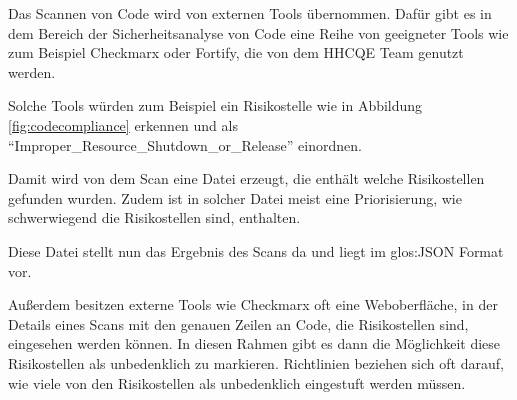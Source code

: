 \documentclass[../main.tex]{subfiles}
\begin{document}
Das Scannen von Code wird von externen Tools übernommen.
Dafür gibt es in dem Bereich der Sicherheitsanalyse von Code eine Reihe von geeigneter Tools wie zum Beispiel Checkmarx oder Fortify, die von dem \gls{HHCQE} Team genutzt werden.

Solche Tools würden zum Beispiel ein Risikostelle wie in Abbildung \ref{fig:codecompliance} erkennen und als \enquote{Improper\_Resource\_Shutdown\_or\_Release} einordnen.
\cite{SASTTools}

Damit wird von dem Scan eine Datei erzeugt, die enthält welche Risikostellen gefunden wurden.
Zudem ist in solcher Datei meist eine Priorisierung, wie schwerwiegend die Risikostellen sind, enthalten.

Diese Datei stellt nun das Ergebnis des Scans da und liegt im \gls{glos:JSON} Format vor.

Außerdem besitzen externe Tools wie Checkmarx oft eine Weboberfläche, in der Details eines Scans mit den genauen Zeilen an Code, die Risikostellen sind, eingesehen werden können.
In diesen Rahmen gibt es dann die Möglichkeit diese Risikostellen als unbedenklich zu markieren.
Richtlinien beziehen sich oft darauf, wie viele von den Risikostellen als unbedenklich eingestuft werden müssen.
\end{document}
